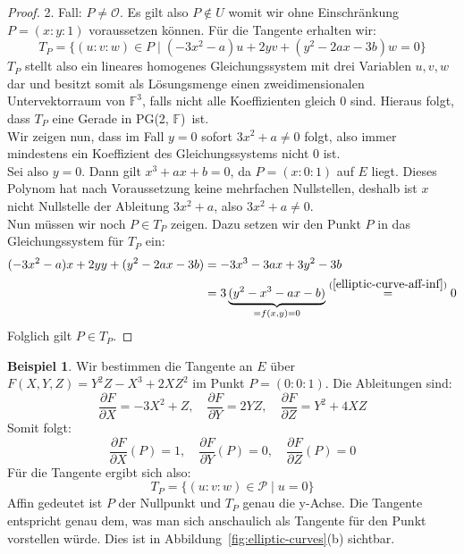 \documentclass[hidelinks]{article}
\theoremstyle{plain}
\theoremstyle{definition}
\newtheorem{bsp}[thm]{Beispiel}
\theoremstyle{rem}
\newcommand{\pgtwo}{PG(2, $\mathbb{F}$)\ }
\newcommand{\patinf}{\mathcal{O}}
\begin{document}
\begin{sloppypar}
\begin{proof}
	2. Fall: $P\ne\patinf$. Es gilt also $P\notin U$ womit wir ohne Einschränkung $P=(x:y:1)$ voraussetzen können. Für die Tangente erhalten wir:
	\begin{equation*}
		T_{P}=\{(u:v:w)\in P\mid (-3x^2-a)u+2yv+(y^2-2ax-3b)w=0\}
	\end{equation*}
	$T_P$ stellt also ein lineares homogenes Gleichungssystem mit drei Variablen $u,v,w$ dar und besitzt somit als Lösungsmenge einen zweidimensionalen Untervektorraum von $\mathbb{F}^3$, falls nicht alle Koeffizienten gleich 0 sind. Hieraus folgt, dass $T_P$ eine Gerade in \pgtwo ist.\\
	Wir zeigen nun, dass im Fall $y=0$ sofort $3x^2+a\ne0$ folgt, also immer mindestens ein Koeffizient des Gleichungssystems nicht 0 ist.\\
	Sei also $y=0$. Dann gilt $x^3+ax+b=0$, da $P=(x:0:1)$ auf $E$ liegt. Dieses Polynom hat nach Voraussetzung keine mehrfachen Nullstellen, deshalb ist $x$ nicht Nullstelle der Ableitung $3x^2+a$, also $3x^2+a\ne0$.\\
	Nun müssen wir noch $P\in T_P$ zeigen. Dazu setzen wir den Punkt $P$ in das Gleichungssystem für $T_P$ ein:
	\begin{align*}
		(-3x^2-a)x+2yy+(y^2-2ax-3b)&=-3x^3-3ax+3y^2-3b\\
	    &=3\underbrace{(y^2-x^3-ax-b)}_{=f(x,y)=0}\stackrel{(\ref{elliptic-curve-aff-inf})}{=}0
	\end{align*}
	Folglich gilt $P\in T_P$.
\end{proof}
\begin{bsp}
	Wir bestimmen die Tangente an $E$ über $F(X,Y,Z)=Y^2Z-X^3+2XZ^2$ im Punkt \mbox{$P=(0:0:1)$}. Die Ableitungen sind:
	\begin{equation*}
		\frac{\partial F}{\partial X}=-3X^2+Z,\quad \frac{\partial F}{\partial Y}=2YZ,\quad \frac{\partial F}{\partial Z}=Y^2+4XZ
	\end{equation*}
	Somit folgt:
	\begin{equation*}
		\frac{\partial F}{\partial X}(P)=1,\quad \frac{\partial F}{\partial Y}(P)=0,\quad \frac{\partial F}{\partial Z}(P)=0
	\end{equation*}
	Für die Tangente ergibt sich also:
	\begin{equation*}
		T_P=\{(u:v:w)\in \mathcal{P}\mid u=0\}
	\end{equation*}
	Affin gedeutet ist $P$ der Nullpunkt und $T_P$ genau die y-Achse. Die Tangente entspricht genau dem, was man sich anschaulich als Tangente für den Punkt vorstellen würde. Dies ist in Abbildung~\ref{fig:elliptic-curves}(b) sichtbar.

\end{bsp}
\end{sloppypar}
\end{document}
